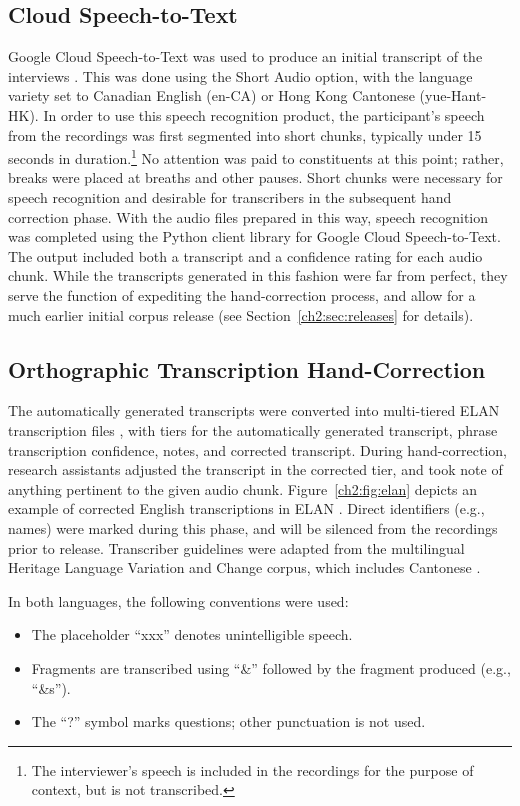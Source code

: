 \subsection{Cloud Speech-to-Text}\label{ch2:subsec:stt}
Google Cloud Speech-to-Text was used to produce an initial transcript of the interviews \citep{google_2019_stt}. This was done using the Short Audio option, with the language variety set to Canadian English (en-CA) or Hong Kong Cantonese (yue-Hant-HK). In order to use this speech recognition product, the participant's speech from the recordings was first segmented into short chunks, typically under 15 seconds in duration.\footnote{The interviewer's speech is included in the recordings for the purpose of context, but is not transcribed.} No attention was paid to constituents at this point; rather, breaks were placed at breaths and other pauses. Short chunks were necessary for speech recognition and desirable for transcribers in the subsequent hand correction phase. With the audio files prepared in this way, speech recognition was completed using the Python client library for Google Cloud Speech-to-Text. The output included both a transcript and a confidence rating for each audio chunk. While the transcripts generated in this fashion were far from perfect, they serve the function of expediting the hand-correction process, and allow for a much earlier initial corpus release (see Section~\ref{ch2:sec:releases} for details).

\subsection{Orthographic Transcription Hand-Correction}\label{ch2:subsec:orthographic}
The automatically generated transcripts were converted into multi-tiered ELAN transcription files \citep{sloetjes_2008_elan}, with tiers for the automatically generated transcript, phrase transcription confidence, notes, and corrected transcript. During hand-correction, research assistants adjusted the transcript in the corrected tier, and took note of anything pertinent to the given audio chunk. Figure~\ref{ch2:fig:elan} depicts an example of corrected English transcriptions in ELAN \citep{sloetjes_2008_elan}. Direct identifiers (e.g., names) were marked during this phase, and will be silenced from the recordings prior to release. Transcriber guidelines were adapted from the multilingual Heritage Language Variation and Change corpus, which includes Cantonese \citep{nagy_2011_hlvc}. 

In both languages, the following conventions were used:
\begin{itemize}
 \item The placeholder ``xxx'' denotes unintelligible speech.
 \item Fragments are transcribed using ``\&'' followed by the fragment produced (e.g., ``\&s'').
 \item The ``?'' symbol marks questions; other punctuation is not used.
\end{itemize}

